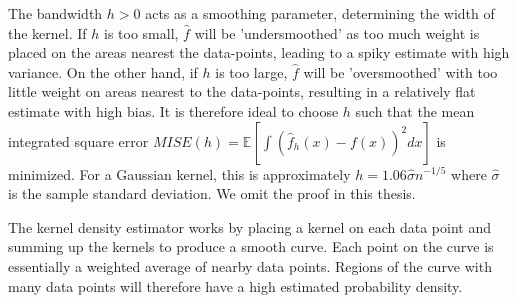 \documentclass[honours,12pt]{unswthesis}
\newcommand{\E}{\mathbb{E}}
\numberwithin{equation}{section}
\theoremstyle{definition}
\begin{document}
The bandwidth $h>0$ acts as a smoothing parameter, determining the width of the kernel. If $h$ is too small, $\hat{f}$ will be 'undersmoothed' as too much weight is placed on the areas nearest the data-points, leading to a spiky estimate with high variance. On the other hand, if $h$ is too large, $\hat{f}$ will be 'oversmoothed' with too little weight on areas nearest to the data-points, resulting in a relatively flat estimate with high bias. It is therefore ideal to choose $h$ such that the mean integrated square error $MISE(h)=\E\left[\int(\hat{f}_h(x)-f(x))^2dx\right]$ is minimized. For a Gaussian kernel, this is approximately $h=1.06\hat{\sigma}n^{-1/5}$ where $\hat{\sigma}$ is the sample standard deviation. We omit the proof in this thesis.

The kernel density estimator works by placing a kernel on each data point and summing up the kernels to produce a smooth curve. Each point on the curve is essentially a weighted average of nearby data points. Regions of the curve with many data points will therefore have a high estimated probability density.
\end{document}
